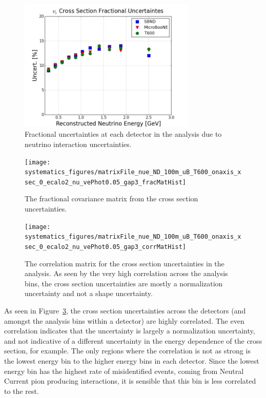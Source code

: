 \begin{figure}[h]
    \centering
    \includegraphics[width=0.75\textwidth]{systematics_figures/matrixFile_nue_ND_100m_uB_T600_onaxis_xsec_0_ecalo2_nu_vePhot0.05_gap3_fracUncert}
    \caption[\nue Cross Section Uncertainties]{Fractional uncertainties at each detector in the \nue analysis due to neutrino interaction uncertainties.}
   \label{fig:sys_xsec_uncert_fracUncert}
\end{figure}

\begin{figure}[h]
    \centering
    \texttt{[image: systematics\_figures/matrixFile\_nue\_ND\_100m\_uB\_T600\_onaxis\_xsec\_0\_ecalo2\_nu\_vePhot0.05\_gap3\_fracMatHist]}
    \caption[\nue Cross Section Fractional Covariance Matrix]{The fractional covariance matrix from the cross section uncertainties.}
   \label{fig:syst_xsec_fracmatrix}
\end{figure}

\begin{figure}[h]
    \centering
    \texttt{[image: systematics\_figures/matrixFile\_nue\_ND\_100m\_uB\_T600\_onaxis\_xsec\_0\_ecalo2\_nu\_vePhot0.05\_gap3\_corrMatHist]}
    \caption[\nue Cross Section Correlation Matrix]{The correlation matrix for the cross section uncertainties in the \nue analysis.  As seen by the very high correlation across the analysis bins, the cross section uncertainties are mostly a normalization uncertainty and not a shape uncertainty.}
   \label{fig:syst_xsec_corrmatrix}
\end{figure}


As seen in Figure~\ref{fig:syst_xsec_corrmatrix}, the cross section uncertainties across the detectors (and amongst the analysis bins within a detector) are highly correlated.  The even correlation indicates that the uncertainty is largely a normalization uncertainty, and not indicative of a different uncertainty in the energy dependence of the cross section, for example.  The only regions where the correlation is not as strong is the lowest energy bin to the higher energy bins in each detector.  Since the lowest energy bin has the highest rate of misidentified events, coming from Neutral Current pion producing interactions, it is sensible that this bin is less correlated to the rest.

